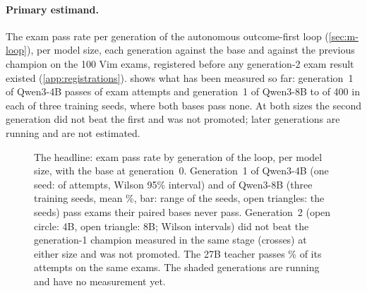 \paragraph{Primary estimand.} The exam pass rate per generation of the autonomous outcome-first loop
(\cref{sec:m-loop}), per model size, each generation against the base and against the previous champion on the 100 Vim exams,
registered before any generation-2 exam result existed (\cref{app:registrations}).  shows what has been
measured so far: generation~1 of Qwen3-4B passes \LoopFourGOnePasses{} of \LoopFourGOneAttempts{} exam attempts and
generation~1 of Qwen3-8B \LoopEightGOnePasses{} to \LoopEightRepOnePasses{} of 400 in each of three training seeds, where
both bases pass none. At both sizes the second generation did not beat the first and was not promoted; later
generations are running and are not estimated.

\begin{figure}[htbp]
\centering

\caption{The headline: exam pass rate by generation of the loop, per model size, with the base at generation~0. Generation~1
of Qwen3-4B (one seed: \LoopFourGOnePasses{} of \LoopFourGOneAttempts{} attempts, Wilson 95\% interval) and of Qwen3-8B
(three training seeds, mean \LoopEightMeanPct\%, bar: range of the seeds, open triangles: the seeds) pass exams their paired
bases never pass. Generation~2 (open circle: 4B, open triangle: 8B; Wilson intervals) did not beat the generation-1 champion measured in
the same stage (crosses) at either size and was not promoted. The 27B teacher passes \TeacherExamPct\% of its attempts on
the same exams. The shaded generations are running and have no measurement yet.}\label{fig:loop}
\end{figure}

